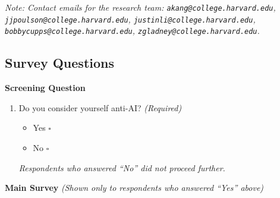 \documentclass[11pt,a4paper,twocolumn,twoside]{rho-class/rho}
\begin{document}
\bigskip
\noindent\textit{Note: Contact emails for the research team: \texttt{akang@college.harvard.edu}, \texttt{jjpoulson@college.harvard.edu}, \texttt{justinli@college.harvard.edu}, \texttt{bobbycupps@college.harvard.edu}, \texttt{zgladney@college.harvard.edu}.}

\subsection*{Survey Questions}

\noindent\textbf{Screening Question}

\begin{enumerate}
    \item Do you consider yourself anti-AI? \hfill \textit{(Required)}
    \begin{itemize}
        \item Yes \quad $\square$
        \item No \quad $\square$
    \end{itemize}
    \textit{Respondents who answered ``No'' did not proceed further.}
\end{enumerate}

\bigskip
\noindent\textbf{Main Survey} \textit{(Shown only to respondents who answered ``Yes'' above)}
\end{document}
